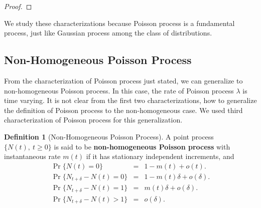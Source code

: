 \documentclass[a4paper,10pt]{article}
\theoremstyle{plain}
\theoremstyle{definition}
\newtheorem{defn}[thm]{Definition}
\begin{document}
\begin{proof}
\end{proof}

We study these characterizations because Poisson process is a fundamental process, just like Gaussian process among the class of distributions.

\subsection{Non-Homogeneous Poisson Process}
From the characterization of Poisson process just stated, we can generalize to non-homogeneous Poisson process. In this case, the rate of Poisson process $\lambda$ is time varying. It is not clear from the first two characterizations, how to generalize the definition of Poisson process to the non-homogeneous case. We used third characterization of Poisson process for this generalization. 

\begin{defn}[Non-Homogeneous Poisson Process]\label{defn:NonHomogeneousPoisson} A point process $\{N(t),~t\geqslant 0\}$ is said to be \textbf{non-homogeneous Poisson process} with instantaneous rate $m(t)$ if it has stationary independent increments, and 
 \begin{eqnarray*}\label{eq:NonHomogeneousPoisson}
 \Pr\{N(t)=0\}&=&1-m(t)+o(t). \\
  \Pr\{N_{t+\delta}-N(t)=0\} &=& 1-m(t)\delta+o(\delta). \\
   \Pr\{N_{t+\delta}-N(t)=1\} &=& m(t)\delta+o(\delta). \\
   \Pr\{N_{t+\delta}-N(t)>1\} &=& o(\delta). \\
   \end{eqnarray*}
\end{defn}
\end{document}

